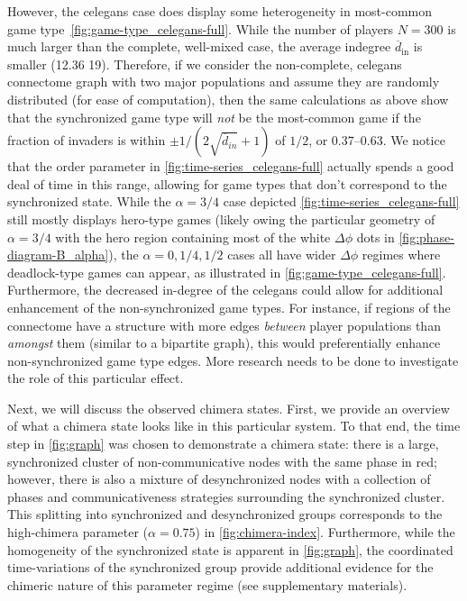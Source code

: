 \documentclass[pdflatex,lineno,referee,sn-mathphys-ay]{sn-jnl}
\begin{document}
However, the \gls{celegans} case does display some heterogeneity
in most-common game type~\cref{fig:game-type_celegans-full}.
While the number of players $N = 300$ is much larger
than the complete, well-mixed case,
the average indegree $\overline{d}_{\text{in}}$
is smaller (\num{12.36} \vs \num{19}).
Therefore, if we consider the non-complete, \gls{celegans} connectome graph
with two major populations
and assume they are randomly distributed (for ease of computation),
then the same calculations as above show that
the synchronized game type will \emph{not} be the most-common game
if the fraction of invaders is within
$\pm 1/(2 \sqrt{\overline{d}_{in}} + 1)$
of $1/2$, or \numrange{0.37}{0.63}.
We notice that the order parameter in \cref{fig:time-series_celegans-full}
actually spends a good deal of time in this range,
allowing for game types that don't correspond to the synchronized state.
While the $\alpha = 3/4$ case depicted \cref{fig:time-series_celegans-full}
still mostly displays hero-type games
(likely owing the particular geometry of $\alpha = 3/4$
with the hero region containing most of the white $\Delta \phi$ dots
in \cref{fig:phase-diagram-B_alpha}),
the $\alpha = 0, 1/4, 1/2$ cases all have wider $\Delta \phi$ regimes where
deadlock-type games can appear, as illustrated in \cref{fig:game-type_celegans-full}.
Furthermore, the decreased in-degree of the \gls{celegans} could allow
for additional enhancement of the non-synchronized game types.
For instance, if regions of the connectome have a structure with more edges
\emph{between} player populations than \emph{amongst} them
(similar to a bipartite graph),
this would preferentially enhance non-synchronized game type edges.
More research needs to be done to investigate the role of this particular effect.

Next, we will discuss the observed chimera states.
First, we provide an overview of what a chimera state
looks like in this particular system.
To that end, the time step in \cref{fig:graph} was chosen
to demonstrate a chimera state:
there is a large, synchronized cluster
of non-communicative nodes with the same phase in red;
however, there is also a mixture of desynchronized nodes
with a collection of phases and communicativeness strategies
surrounding the synchronized cluster.
This splitting into synchronized and desynchronized groups
corresponds to the high-chimera parameter ($\alpha = 0.75$)
in \cref{fig:chimera-index}.
Furthermore, while the homogeneity of the synchronized state is apparent
in \cref{fig:graph},
the coordinated time-variations of the synchronized group
provide additional evidence for the chimeric nature
of this parameter regime (see supplementary materials).
\end{document}
